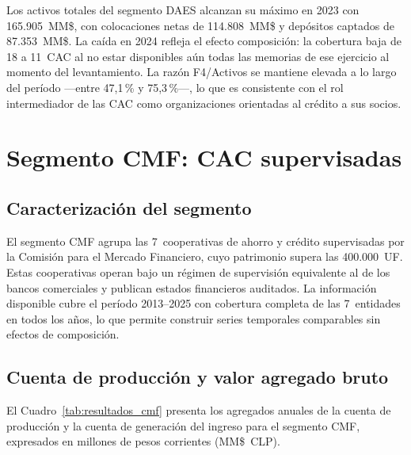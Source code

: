Los activos totales del segmento DAES alcanzan su máximo en
2023 con 165.905~MM\$, con colocaciones netas de 114.808~MM\$
y depósitos captados de 87.353~MM\$. La caída en 2024 refleja
el efecto composición: la cobertura baja de 18 a 11~CAC al no
estar disponibles aún todas las memorias de ese ejercicio al
momento del levantamiento. La razón F4/Activos se mantiene
elevada a lo largo del período —entre 47,1\,\% y 75,3\,\%—,
lo que es consistente con el rol intermediador de las CAC como
organizaciones orientadas al crédito a sus socios.

\section{Segmento CMF: CAC supervisadas}
\label{sec:resultados-cmf}

\subsection{Caracterización del segmento}
\label{subsec:caracterizacion-cmf}
El segmento CMF agrupa las 7~cooperativas de ahorro y crédito
supervisadas por la Comisión para el Mercado Financiero,
cuyo patrimonio supera las 400.000~UF. Estas cooperativas
operan bajo un régimen de supervisión equivalente al de los
bancos comerciales y publican estados financieros auditados.
La información disponible cubre el período 2013--2025 con
cobertura completa de las 7~entidades en todos los años,
lo que permite construir series temporales comparables
sin efectos de composición.

\subsection{Cuenta de producción y valor agregado bruto}
\label{subsec:produccion-cmf}
El Cuadro~\ref{tab:resultados_cmf} presenta los agregados
anuales de la cuenta de producción y la cuenta de generación
del ingreso para el segmento CMF, expresados en millones de
pesos corrientes (MM\$~CLP).

